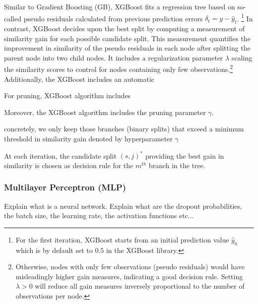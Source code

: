 \documentclass[12pt]{article}
\begin{document}
Similar to Gradient Boosting (GB), XGBoost fits a regression tree based on so-called pseudo residuals calculated from previous prediction errors $\delta_{t} = y - \hat{y}_{t}$. \footnote{For the first iteration, XGBoost starts from an initial prediction value $\hat{y}_{0}$ which is by default set to $0.5$ in the XGBoost library.} In contrast, XGBoost decides upon the best split by computing a measurement of similarity gain for each possible candidate split. This measurement quantifies the improvement in similarity of the pseudo residuals in each node after splitting the parent node into two child nodes. It includes a regularization parameter $\lambda$ scaling the similarity scores to control for nodes containing only few observations.\footnote{Otherwise, nodes with only few observations (pseudo residuals) would have misleadingly higher gain measures, indicating a good decision rule. Setting $\lambda > 0$ will reduce all gain measures inversely proportional to the number of observations per node.} Additionally, the XGBoost includes an automatic 

For pruning, XGBoost algorithm includes 

Moreover, the XGBoost algorithm includes the pruning parameter $\gamma$. 

concretely, we only keep those branches (binary splits) that exceed a minimum threshold in similarity gain denoted by hyperparameter $\gamma$


At each iteration, the candidate split $(s, j)^{*}$ providing the best gain in similarity is chosen as decision rule for the $m^{th}$ branch in the tree. 



\subsubsection{Multilayer Perceptron (MLP)}
\noindent Explain what is a neural network. Explain what are the dropout probabilities, the batch size, the learning rate, the activation functions etc...
\end{document}
